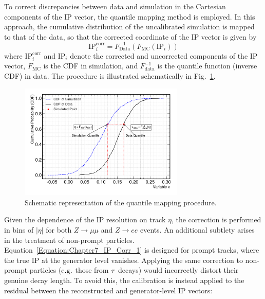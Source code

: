 To correct discrepancies between data and simulation in the Cartesian components of the \ac{IP} vector, the quantile mapping method is employed. In this approach, the cumulative distribution of the uncalibrated simulation is mapped to that of the data, so that the corrected coordinate of the \ac{IP} vector is given by
\begin{equation}
\mathrm{IP}_i^{\mathrm{corr}} = F^{-1}_{\mathrm{Data}}\!\left( F_{\mathrm{MC}}(\mathrm{IP}_i) \right)
\label{Equation:Chapter7_IP_Corr_1}
\end{equation}
where $\mathrm{IP}_i^{\mathrm{corr}}$ and $\mathrm{IP}_i$ denote the corrected and uncorrected components of the IP vector, $F_{\mathrm{MC}}$ is the \ac{CDF} in simulation, and $F^{-1}_{\mathrm{data}}$ is the quantile function (inverse \ac{CDF}) in data. The procedure is illustrated schematically in Fig.~\ref{Figure:IP_QuantileMapping}.

\begin{figure}[h]
    \centering
    \includegraphics[width=0.7\textwidth]{Figures/Chapter7/quantile_mapping.pdf}
    \caption{Schematic representation of the quantile mapping procedure.}
    \label{Figure:IP_QuantileMapping}
\end{figure}

Given the dependence of the IP resolution on track $\eta$, the correction is performed in bins of $|\eta|$ for both $Z \to \mu\mu$ and $Z \to ee$ events. An additional subtlety arises in the treatment of non-prompt particles. Equation~\ref{Equation:Chapter7_IP_Corr_1} is designed for prompt tracks, where the true \ac{IP} at the generator level vanishes. Applying the same correction to non-prompt particles ($\mbox{e.g.}$ those from $\tau$ decays) would incorrectly distort their genuine decay length. To avoid this, the calibration is instead applied to the residual between the reconstructed and generator-level IP vectors:

